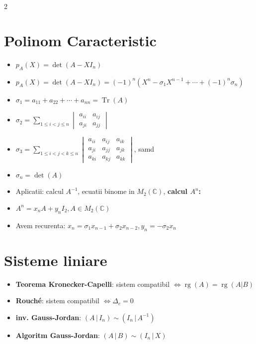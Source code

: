 \documentclass[10pt]{extarticle}
\begin{document}
\begin{multicols*}{2}
\section*{Polinom Caracteristic}
\begin{itemize}[leftmargin=*]
  \item $p_A(X) = \det(A - X I_n)$
  \item $p_A(X) = \det(A - X I_n) = (-1)^n (X^n - \sigma_1 X^{n-1} + \cdots + (-1)^n\sigma_n)$
  \item $\sigma_1 = a_{11} + a_{22} + \cdots + a_{nn} = \operatorname{Tr}(A)$
  \item $\sigma_2 = \sum_{1 \le i < j \le n} \begin{vmatrix} a_{ii} & a_{ij} \\ a_{ji} & a_{jj} \end{vmatrix}$
  \item $\sigma_3 = \sum_{1 \le i < j < k \le n} \begin{vmatrix}
    a_{ii} & a_{ij} & a_{ik} \\
    a_{ji} & a_{jj} & a_{jk} \\
    a_{ki} & a_{kj} & a_{kk}
    \end{vmatrix}$, samd
  \item $\sigma_n = \operatorname{det}(A)$
  \item Aplicatii: calcul $A^{-1}$, ecuatii binome in $M_2(\mathbb{C})$, \textbf{calcul $A^n$:}
  \item $A^n = x_nA + y_nI_2, A \in M_2(\mathbb{C})$
  \item Avem recurenta: $x_n = \sigma_1 x_{n-1} + \sigma_2 x_{n-2}, y_n = -\sigma_2 x_n$
\end{itemize}

\section*{Sisteme liniare}
\begin{itemize}[leftmargin=*]
  \item \textbf{Teorema Kronecker-Capelli}: sistem compatibil $\Leftrightarrow \operatorname{rg}(A) = \operatorname{rg}(A|B)$
  \item \textbf{Rouché}: sistem compatibil  $\Leftrightarrow \Delta_c = 0$
  \item \textbf{inv. Gauss-Jordan}: $(A\,|\,I_n) \sim (I_n\,|\,A^{-1})$
  \item \textbf{Algoritm Gauss-Jordan}: $(A\,|\,B) \sim (I_n\,|\,X)$
\end{itemize}


\end{multicols*}
\end{document}
